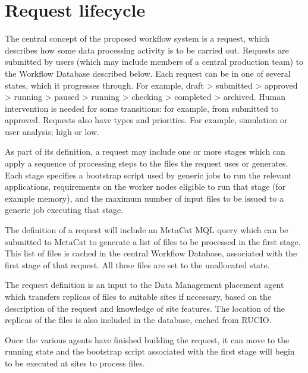 \documentclass[../main-v1.tex]{subfiles}
\begin{document}
\section{Request lifecycle}
\label{sec:flow:lifecycle}

The central concept of the proposed workflow system is a request, which describes how some data processing activity is to be carried out. Requests are submitted by users (which may include members of a central production team) to the Workflow Database described below. Each request can be in one of several states, which it progresses through. For example, draft > submitted > approved > running > paused > running > checking > completed > archived. Human intervention is needed for some transitions: for example, from submitted to approved. Requests also have types and priorities. For example, simulation or user analysis; high or low.

As part of its definition, a request may include one or more stages which can apply a sequence of processing steps to the files the request uses or generates. Each stage specifies a bootstrap script used by generic jobs to run the relevant applications, requirements on the worker nodes eligible to run that stage (for example memory), and the maximum number of input files to be issued to a generic job executing that stage.

The definition of a request will include an MetaCat MQL query which can be submitted to MetaCat to generate a list of files to be processed in the first stage. This list of files is cached in the central Workflow Database, associated with the first stage of that request. All these files are set to the unallocated state. 

The request definition is an input to the Data Management placement agent which transfers replicas of files to suitable sites if necessary, based on the description of the request and knowledge of site features. The location of the replicas of the files is also included in the database, cached from RUCIO. 

Once the various agents have finished building the request, it can move to the running state and the bootstrap script associated with the first stage will begin to be executed at sites to process files.
\end{document}
